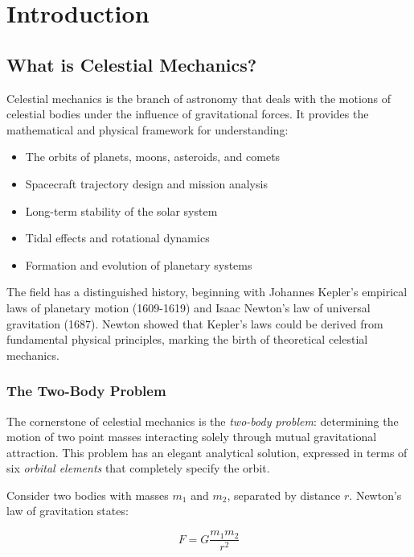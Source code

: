 \chapter{Introduction}
\label{ch:introduction}

\section{What is Celestial Mechanics?}

Celestial mechanics is the branch of astronomy that deals with the motions of celestial bodies under the influence of gravitational forces. It provides the mathematical and physical framework for understanding:

\begin{itemize}
    \item The orbits of planets, moons, asteroids, and comets
    \item Spacecraft trajectory design and mission analysis
    \item Long-term stability of the solar system
    \item Tidal effects and rotational dynamics
    \item Formation and evolution of planetary systems
\end{itemize}

The field has a distinguished history, beginning with Johannes Kepler's empirical laws of planetary motion (1609-1619) and Isaac Newton's law of universal gravitation (1687). Newton showed that Kepler's laws could be derived from fundamental physical principles, marking the birth of theoretical celestial mechanics.

\subsection{The Two-Body Problem}

The cornerstone of celestial mechanics is the \textit{two-body problem}: determining the motion of two point masses interacting solely through mutual gravitational attraction. This problem has an elegant analytical solution, expressed in terms of six \textit{orbital elements} that completely specify the orbit.

Consider two bodies with masses $m_1$ and $m_2$, separated by distance $r$. Newton's law of gravitation states:

\begin{equation}
F = G\frac{m_1 m_2}{r^2}
\end{equation}

